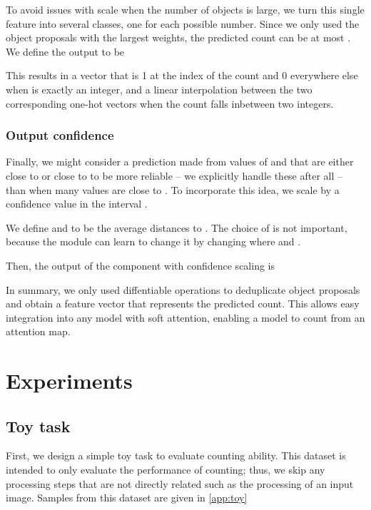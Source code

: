 \documentclass[letterpaper]{article}
\begin{document}
To avoid issues with scale when the number of objects is large, we turn this single feature into several classes, one for each possible number.
Since we only used the object proposals with the largest  weights, the predicted count  can be at most .
We define the output  to be


This results in a vector that is 1 at the index of the count and 0 everywhere else when  is exactly an integer, and a linear interpolation between the two corresponding one-hot vectors when the count falls inbetween two integers.

\subsubsection{Output confidence}
Finally, we might consider a prediction made from values of  and  that are either close to  or close to  to be more reliable -- we explicitly handle these after all -- than when many values are close to .
To incorporate this idea, we scale  by a confidence value in the interval .

We define  and  to be the average distances to .
The choice of  is not important, because the module can learn to change it by changing where  and .


Then, the output of the component with confidence scaling is


In summary, we only used diffentiable operations to deduplicate object proposals and obtain a feature vector that represents the predicted count.
This allows easy integration into any model with soft attention, enabling a model to count from an attention map.
 

\section{Experiments}\label{sec:experiments}

\subsection{Toy task}
First, we design a simple toy task to evaluate counting ability.
This dataset is intended to only evaluate the performance of counting; thus, we skip any processing steps that are not directly related such as the processing of an input image.
Samples from this dataset are given in \autoref{app:toy}
\end{document}
